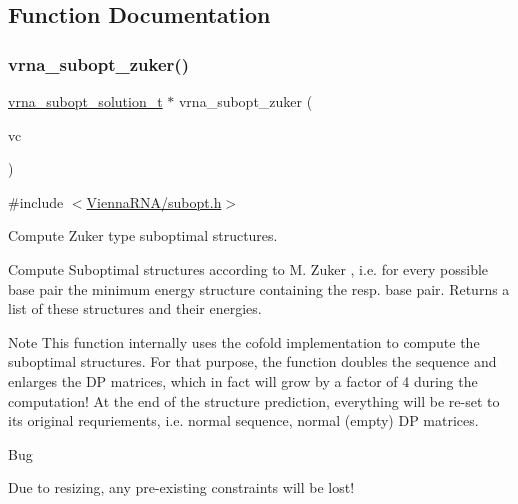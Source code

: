 \subsection{Function Documentation}
\mbox{\label{group__subopt__zuker_gababde9d210eb433854f1e71da7815fbb}} 
\subsubsection{\texorpdfstring{vrna\+\_\+subopt\+\_\+zuker()}{vrna\_subopt\_zuker()}}
{\footnotesize\ttfamily \mbox{\hyperlink{subopt_8h_a01ae9a0f27d245d89f705afd843fc457}{vrna\+\_\+subopt\+\_\+solution\+\_\+t}} $\ast$ vrna\+\_\+subopt\+\_\+zuker (\begin{DoxyParamCaption}\item[{\mbox{\hyperlink{group__fold__compound_ga1b0cef17fd40466cef5968eaeeff6166}{vrna\+\_\+fold\+\_\+compound\+\_\+t}} $\ast$}]{vc }\end{DoxyParamCaption})}



{\ttfamily \#include $<$\mbox{\hyperlink{subopt_8h}{Vienna\+R\+N\+A/subopt.\+h}}$>$}



Compute Zuker type suboptimal structures. 

Compute Suboptimal structures according to M. Zuker \cite{zuker:1989} , i.\+e. for every possible base pair the minimum energy structure containing the resp. base pair. Returns a list of these structures and their energies.

\begin{DoxyNote}{Note}
This function internally uses the cofold implementation to compute the suboptimal structures. For that purpose, the function doubles the sequence and enlarges the DP matrices, which in fact will grow by a factor of 4 during the computation! At the end of the structure prediction, everything will be re-\/set to its original requriements, i.\+e. normal sequence, normal (empty) DP matrices.
\end{DoxyNote}
\begin{DoxyRefDesc}{Bug}
\item[\mbox{\hyperlink{bug__bug000001}{Bug}}]Due to resizing, any pre-\/existing constraints will be lost!\end{DoxyRefDesc}


